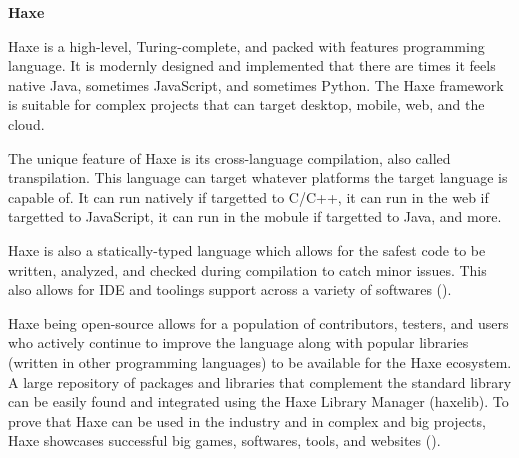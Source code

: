 \flushleft
\textbf{Haxe}\\
\justifying

\parx
Haxe is a high-level, Turing-complete, and packed with features programming language.
It is modernly designed and implemented that there are times it feels native Java,
sometimes JavaScript, and sometimes Python. The Haxe framework is suitable for complex
projects that can target desktop, mobile, web, and the cloud.

The unique feature of Haxe is its cross-language compilation, also called transpilation.
This language can target whatever platforms the target language is capable of. It can
run natively if targetted to C/C++, it can run in the web if targetted to JavaScript,
it can run in the mobule if targetted to Java, and more.

Haxe is also a statically-typed language which allows for the safest code to be written,
analyzed, and checked during compilation to catch minor issues. This also allows for
IDE and toolings support across a variety of softwares (\cite{coates_2018}).

Haxe being open-source allows for a population of contributors, testers, and users who
actively continue to improve the language along with popular libraries (written in other
programming languages) to be available for the Haxe ecosystem. A large repository of
packages and libraries that complement the standard library can be easily found and
integrated using the Haxe Library Manager (haxelib). To prove that Haxe can be used in
the industry and in complex and big projects, Haxe showcases successful big games,
softwares, tools, and websites (\cite{haxe_2020}).

